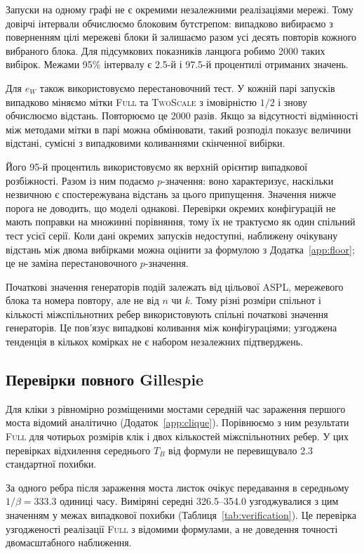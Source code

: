 \documentclass[a4paper,fleqn]{cas-sc}
\newcommand{\Full}{\textup{\textsc{Full}}}
\newcommand{\TS}{\textup{\textsc{TwoScale}}}
\newcommand{\eW}{e_{W}}
\begin{document}
Запуски на одному графі не є окремими незалежними реалізаціями мережі. Тому довірчі інтервали обчислюємо блоковим бутстрепом: випадково вибираємо з поверненням цілі мережеві блоки й залишаємо разом усі десять повторів кожного вибраного блока. Для підсумкових показників ланцюга робимо 2000 таких вибірок. Межами 95\% інтервалу є 2.5-й і 97.5-й процентилі отриманих значень.
\par Для $\eW$ також використовуємо перестановочний тест. У кожній парі запусків випадково міняємо мітки \Full{} та \TS{} з імовірністю $1/2$ і знову обчислюємо відстань. Повторюємо це 2000 разів. Якщо за відсутності відмінності між методами мітки в парі можна обмінювати, такий розподіл показує величини відстані, сумісні з випадковими коливаннями скінченної вибірки.
\par Його 95-й процентиль використовуємо як верхній орієнтир випадкової розбіжності. Разом із ним подаємо $p$-значення: воно характеризує, наскільки незвичною є спостережувана відстань за цього припущення. Значення нижче порога не доводить, що моделі однакові. Перевірки окремих конфігурацій не мають поправки на множинні порівняння, тому їх не трактуємо як один спільний тест усієї серії. Коли дані окремих запусків недоступні, наближену очікувану відстань між двома вибірками можна оцінити за формулою з Додатка~\ref*{app:floor}; це не заміна перестановочного $p$-значення.

Початкові значення генераторів подій залежать від цільової ASPL, мережевого блока та номера повтору, але не від $n$ чи $k$. Тому різні розміри спільнот і кількості міжспільнотних ребер використовують спільні початкові значення генераторів. Це пов'язує випадкові коливання між конфігураціями; узгоджена тенденція в кількох комірках не є набором незалежних підтверджень.

\subsection{Перевірки повного Gillespie}

Для кліки з рівномірно розміщеними мостами середній час зараження першого моста відомий аналітично (Додаток~\ref*{app:clique}). Порівнюємо з ним результати \Full{} для чотирьох розмірів клік і двох кількостей міжспільнотних ребер. У цих перевірках відхилення середнього $T_B$ від формули не перевищувало 2.3 стандартної похибки.
\par За одного ребра після зараження моста листок очікує передавання в середньому $1/\beta=333.3$ одиниці часу. Виміряні середні 326.5--354.0 узгоджувалися з цим значенням у межах випадкової похибки (Таблиця~\ref*{tab:verification}). Це перевірка узгодженості реалізації \Full{} з відомими формулами, а не доведення точності двомасштабного наближення.


\end{document}

